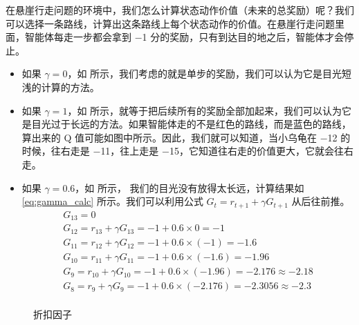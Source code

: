 在悬崖行走问题的环境中，我们怎么计算状态动作价值（未来的总奖励）呢？我们可以选择一条路线，计算出这条路线上每个状态动作的价值。在悬崖行走问题里面，智能体每走一步都会拿到 $-$1 分的奖励，只有到达目的地之后，智能体才会停止。
\begin{itemize}
	\item 如果 $\gamma = 0$，如 所示，我们考虑的就是单步的奖励，我们可以认为它是目光短浅的计算的方法。
	\item 如果 $\gamma = 1$，如 所示，就等于把后续所有的奖励全部加起来，我们可以认为它是目光过于长远的方法。如果智能体走的不是红色的路线，而是蓝色的路线，算出来的 Q 值可能如图中所示。因此，我们就可以知道，当小乌龟在 $-$12 的时候，往右走是 $-$11，往上走是 $-$15，它知道往右走的价值更大，它就会往右走。
	\item 如果 $\gamma = 0.6$，如 所示，
	我们的目光没有放得太长远，计算结果如\eqref{eq:gamma_calc} 所示。我们可以利用公式 $G_{t}=r_{t+1}+\gamma G_{t+1}$ 从后往前推。
	\begin{equation}
		\begin{array}{l}
			G_{13}=0 \\
			G_{12}=r_{13}+\gamma G_{13}=-1+0.6 \times 0=-1 \\
			G_{11}=r_{12}+\gamma G_{12}=-1+0.6 \times(-1)=-1.6 \\
			G_{10}=r_{11}+\gamma G_{11}=-1+0.6 \times(-1.6)=-1.96 \\
			G_{9}=r_{10}+\gamma G_{10}=-1+0.6 \times(-1.96)=-2.176 \approx-2.18 \\
			G_{8}=r_{9}+\gamma G_{9}=-1+0.6 \times(-2.176)=-2.3056 \approx-2.3 \\
			\end{array}
		\label{eq:gamma_calc}
	\end{equation}
\end{itemize}

\begin{figure}[htb]
	\centering

	\caption{折扣因子}
	\label{fig:discount_factor}
\end{figure}

